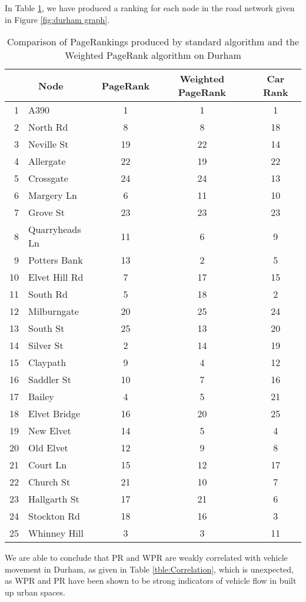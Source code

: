 \documentclass[11pt]{report}
\begin{document}
In Table \ref{tble:Durham comparison}, we have produced a ranking for each node in the road network given in Figure \ref{fig:durham graph}. 
\begin{table}[h] \caption{Comparison of PageRankings produced by standard algorithm and the Weighted PageRank algorithm on Durham}
 \centering
 \begin{tabular} {r l| c c| c} 
 \multicolumn{2}{c|}{Node}& PageRank & Weighted PageRank & Car Rank\\ [0.5ex] 
 \hline
 1&A390&1&1&1\\
 \rowcolor{yellow}
 2&North Rd&8&8&18\\
 3&Neville St&19&22&14\\
 4&Allergate&22&19&22\\
 5&Crossgate&24&24&13\\
 6&Margery Ln&6&11&10\\
 7&Grove St&23&23&23\\
 8&Quarryheads Ln&11&6&9\\
 9&Potters Bank&13&2&5\\
 10&Elvet Hill Rd&7&17&15\\
 \rowcolor{yellow}
 11&South Rd&5&18&2\\
  \rowcolor{yellow}
 12&Milburngate&20&25&24\\
 13&South St&25&13&20\\
  \rowcolor{yellow}
 14&Silver St&2&14&19\\
 15&Claypath&9&4&12\\
 16&Saddler St&10&7&16\\
  \rowcolor{yellow}
 17&Bailey&4&5&21\\
  \rowcolor{yellow}
 18&Elvet Bridge&16&20&25\\
 19&New Elvet&14&5&4\\
 20&Old Elvet&12&9&8\\
 21&Court Ln&15&12&17\\
 22&Church St&21&10&7\\
  \rowcolor{yellow}
 23&Hallgarth St&17&21&6\\
  \rowcolor{yellow}
 24&Stockton Rd&18&16&3\\
 25&Whinney Hill&3&3&11\\
  \end{tabular}
 \label{tble:Durham comparison}
\end{table}
We are able to conclude that PR and WPR are weakly correlated with vehicle movement in Durham, as given in Table \ref{tble:Correlation}, which is unexpected, as WPR and PR have been shown to be strong indicators of vehicle flow in built up urban spaces.
\end{document}
